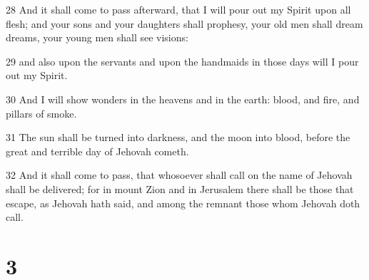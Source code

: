 \par 28 And it shall come to pass afterward, that I will pour out my Spirit upon all flesh; and your sons and your daughters shall prophesy, your old men shall dream dreams, your young men shall see visions:
\par 29 and also upon the servants and upon the handmaids in those days will I pour out my Spirit.
\par 30 And I will show wonders in the heavens and in the earth: blood, and fire, and pillars of smoke.
\par 31 The sun shall be turned into darkness, and the moon into blood, before the great and terrible day of Jehovah cometh.
\par 32 And it shall come to pass, that whosoever shall call on the name of Jehovah shall be delivered; for in mount Zion and in Jerusalem there shall be those that escape, as Jehovah hath said, and among the remnant those whom Jehovah doth call.

\chapter{3}


